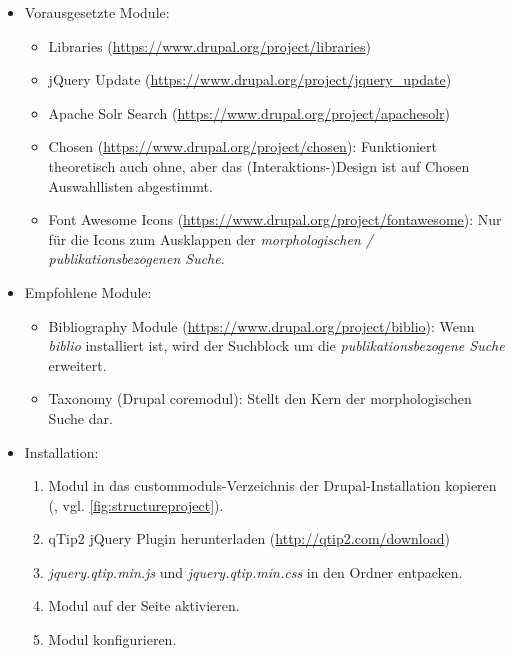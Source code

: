 \begin{itemize}[parsep=0pt, itemsep=5.0pt plus 2.0pt minus 1.0pt, leftmargin=*]
	\item Vorausgesetzte Module:
	\begin{itemize}
		\item Libraries (\url{https://www.drupal.org/project/libraries})
		\item jQuery Update (\url{https://www.drupal.org/project/jquery_update})
		\item Apache Solr Search (\url{https://www.drupal.org/project/apachesolr})
		\item Chosen (\url{https://www.drupal.org/project/chosen}): Funktioniert theoretisch auch ohne, aber das (Interaktions-)Design ist auf Chosen Auswahllisten abgestimmt.  
		\item Font Awesome Icons (\url{https://www.drupal.org/project/fontawesome}): Nur für die Icons zum Ausklappen der \textit{morphologischen / publikationsbezogenen Suche}.
	\end{itemize}
	
	\item Empfohlene Module:
	\begin{itemize}
		\item Bibliography Module (\url{https://www.drupal.org/project/biblio}): Wenn \textit{biblio} installiert ist, wird der Suchblock um die \textit{publikationsbezogene Suche} erweitert.
		\item Taxonomy (Drupal \gls{coremodul}): Stellt den Kern der morphologischen Suche dar.
	\end{itemize}

	\item Installation: 
	\begin{enumerate}
		\item Modul in das \glspl{custommodul}-Verzeichnis der Drupal-Installation kopieren  (\zB {}, vgl. \cref{fig:structureproject}).
		\item qTip2 jQuery Plugin herunterladen (\url{http://qtip2.com/download}) 
		\item \textit{jquery.qtip.min.js} und \textit{jquery.qtip.min.css} in den Ordner  entpacken.
		\item Modul auf der Seite  aktivieren.
		\item Modul konfigurieren.
		
	\end{enumerate}
	

\end{itemize}

